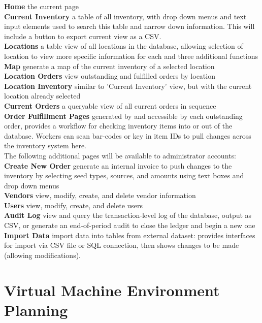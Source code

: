 \documentclass[12pt, letterpaper,oneocolumn]{article}
\begin{document}
\begin{outline}
\1 \textbf{Home} the current page\\
\1 \textbf{Current Inventory} a table of all inventory, with drop down menus and text input elements used to search this table and narrow down information. This will include a button to export current view as a CSV.\\
\1 \textbf{Locations} a table view of all locations in the database, allowing selection of location to view more specific information for each and three additional functions\\
	\2 \textbf{Map} generate a map of the current inventory of a selected location \\
	\2 \textbf{Location Orders} view outstanding and fulfilled orders by location\\
	\2 \textbf{Location Inventory} similar to 'Current Inventory' view, but with the current location already selected\\
\1 \textbf{Current Orders} a queryable view of all current orders in sequence\\
	\2 \textbf{Order Fulfillment Pages} generated by and accessible by each outstanding order, provides a workflow for checking inventory items into or out of the database. Workers can scan bar-codes or key in item IDs to pull changes across the inventory system here.\\
The following additional pages will be available to administrator accounts:\\
\1 \textbf{Create New Order} generate an internal invoice to push changes to the inventory by selecting seed types, sources, and amounts using text boxes and drop down menus\\
\1 \textbf{Vendors} view, modify, create, and delete vendor information\\
\1 \textbf{Users} view, modify, create, and delete users\\
\1 \textbf{Audit Log} view and query the transaction-level log of the database, output as CSV, or generate an end-of-period audit to close the ledger and begin a new one\\
\1 \textbf{Import Data} import data into tables from external dataset: provides interfaces for import via CSV file or SQL connection, then shows changes to be made (allowing modifications).\\
\end{outline}

\section{Virtual Machine Environment Planning}
\end{document}
